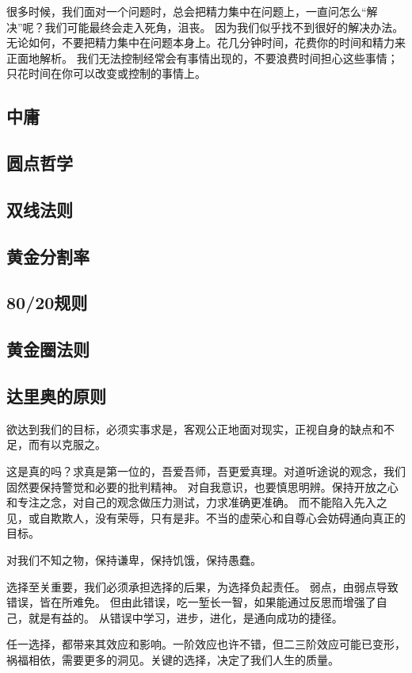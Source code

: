 很多时候，我们面对一个问题时，总会把精力集中在问题上，一直问怎么“解决”呢？我们可能最终会走入死角，沮丧。
因为我们似乎找不到很好的解决办法。无论如何，不要把精力集中在问题本身上。花几分钟时间，花费你的时间和精力来正面地解析。
我们无法控制经常会有事情出现的，不要浪费时间担心这些事情；只花时间在你可以改变或控制的事情上。

\subsection{中庸}

\subsection{圆点哲学}
\subsection{双线法则}
\subsection{黄金分割率}
\subsection{80/20规则}
\subsection{黄金圈法则}

\subsection{达里奥的原则}

欲达到我们的目标，必须实事求是，客观公正地面对现实，正视自身的缺点和不足，而有以克服之。

这是真的吗？求真是第一位的，吾爱吾师，吾更爱真理。对道听途说的观念，我们固然要保持警觉和必要的批判精神。
对自我意识，也要慎思明辨。保持开放之心和专注之念，对自己的观念做压力测试，力求准确更准确。
而不能陷入先入之见，或自欺欺人，没有荣辱，只有是非。不当的虚荣心和自尊心会妨碍通向真正的目标。

对我们不知之物，保持谦卑，保持饥饿，保持愚蠢。

选择至关重要，我们必须承担选择的后果，为选择负起责任。
弱点，由弱点导致错误，皆在所难免。
但由此错误，吃一堑长一智，如果能通过反思而增强了自己，就是有益的。
从错误中学习，进步，进化，是通向成功的捷径。

任一选择，都带来其效应和影响。一阶效应也许不错，但二三阶效应可能已变形，
祸福相依，需要更多的洞见。关键的选择，决定了我们人生的质量。

